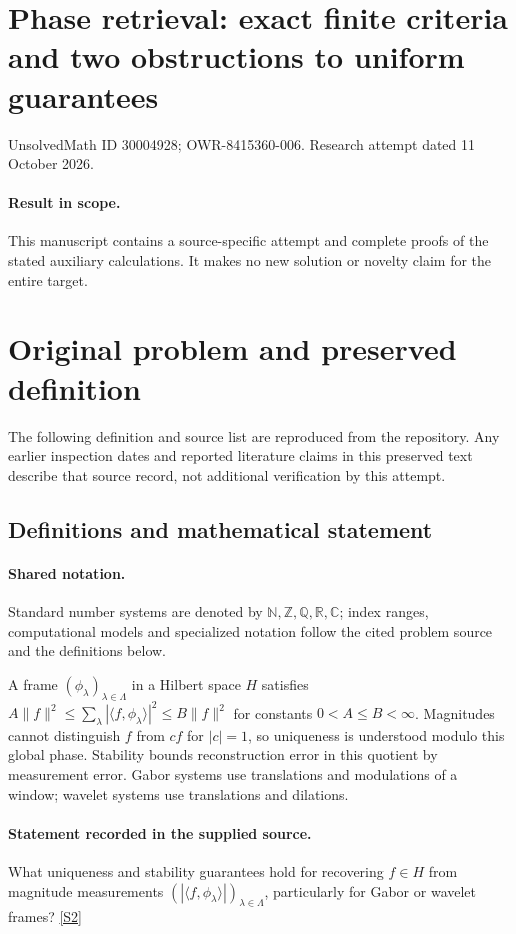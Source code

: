 \documentclass[11pt]{article}
\begin{document}
\section*{Phase retrieval: exact finite criteria and two obstructions to uniform guarantees}
\noindent UnsolvedMath ID 30004928; OWR-8415360-006. Research attempt dated 11 October 2026.
\paragraph{Result in scope.}This manuscript contains a source-specific attempt and complete proofs of the stated auxiliary calculations. It makes no new solution or novelty claim for the entire target.
\section{Original problem and preserved definition}
The following definition and source list are reproduced from the repository. Any earlier inspection dates and reported literature claims in this preserved text describe that source record, not additional verification by this attempt.
\subsection{Definitions and mathematical statement}

\paragraph{Shared notation.}Standard number systems are denoted by $\mathbb N,\mathbb Z,\mathbb Q,\mathbb R,\mathbb C$; index ranges, computational models and specialized notation follow the cited problem source and the definitions below.


A frame $(\phi_\lambda)_{\lambda\in\Lambda}$ in a Hilbert space $H$ satisfies $A\|f\|^2\leq\sum_\lambda|\langle f,\phi_\lambda\rangle|^2\leq B\|f\|^2$ for constants $0<A\leq B<\infty$. Magnitudes cannot distinguish $f$ from $cf$ for $|c|=1$, so uniqueness is understood modulo this global phase. Stability bounds reconstruction error in this quotient by measurement error. Gabor systems use translations and modulations of a window; wavelet systems use translations and dilations.
\paragraph{Statement recorded in the supplied source.}
What uniqueness and stability guarantees hold for recovering $f\in H$ from magnitude measurements $(|\langle f,\phi_\lambda\rangle|)_{\lambda\in\Lambda}$, particularly for Gabor or wavelet frames? \href{https://doi.org/10.4171/owr/2021/55}{[S2]}
\end{document}
